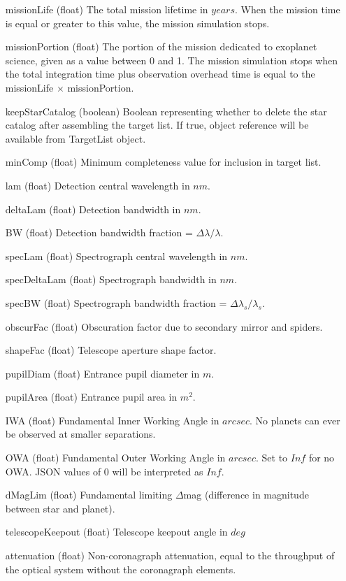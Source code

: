 \documentclass[cleanfoot]{asme2ej}
\begin{document}
\begin{itemize}[leftmargin=1in,font={\ttfamily}]
\item[missionLife] (float) The total mission lifetime in $ years $.  When the mission time is equal or greater to this value, the mission simulation stops.
\item[missionPortion] (float) The portion of the mission dedicated to exoplanet science, given as a value between 0 and 1. The mission simulation stops when the total integration time plus observation overhead time is equal to the missionLife $\times$ missionPortion.
\item[keepStarCatalog] (boolean) Boolean representing whether to delete the star catalog after assembling the target list.  If true, object reference will be available from TargetList object.
\item[minComp] (float) Minimum completeness value for inclusion in target list. 
\item[lam] (float) Detection central wavelength in $ nm $.
\item[deltaLam] (float) Detection bandwidth in $ nm $.
\item[BW] (float) Detection bandwidth fraction = $\Delta\lambda/\lambda$.
\item[specLam] (float) Spectrograph central wavelength in $ nm $.
\item[specDeltaLam] (float) Spectrograph bandwidth in $ nm $.
\item[specBW] (float) Spectrograph bandwidth fraction = $\Delta\lambda_s/\lambda_s$.
\item[obscurFac] (float) Obscuration factor due to secondary mirror and spiders.
\item[shapeFac] (float)  Telescope aperture shape factor.
\item[pupilDiam] (float) Entrance pupil diameter in $m$.
\item[pupilArea] (float) Entrance pupil area in $m^2$.
\item[IWA] (float) Fundamental Inner Working Angle in $ arcsec $. No planets can ever be observed at smaller separations.
\item[OWA] (float) Fundamental Outer Working Angle in $ arcsec $. Set to $ Inf $ for no OWA. JSON values of 0 will be interpreted as $ Inf $.
\item[dMagLim] (float) Fundamental limiting $\Delta$mag (difference in magnitude between star and planet). 
\item[telescopeKeepout] (float) Telescope keepout angle in $ deg $
\item[attenuation] (float) Non-coronagraph attenuation, equal to the throughput of the optical system without the coronagraph elements.

\end{itemize}
\end{document}
